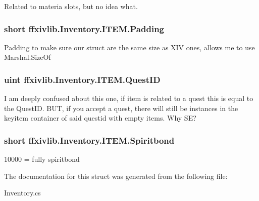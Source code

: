 Related to materia slots, but no idea what. 

\hypertarget{structffxivlib_1_1_inventory_1_1_i_t_e_m_a634f97f3e65815bdbc434e7ab6da0fb5}{
\subsubsection[{Padding}]{\setlength{\rightskip}{0pt plus 5cm}short ffxivlib.\-Inventory.\-I\-T\-E\-M.\-Padding}}\label{structffxivlib_1_1_inventory_1_1_i_t_e_m_a634f97f3e65815bdbc434e7ab6da0fb5}


Padding to make sure our struct are the same size as X\-I\-V ones, allows me to use Marshal.\-Size\-Of 

\hypertarget{structffxivlib_1_1_inventory_1_1_i_t_e_m_ac030523cf6f369af9a9be1987df970ef}{
\subsubsection[{Quest\-I\-D}]{\setlength{\rightskip}{0pt plus 5cm}uint ffxivlib.\-Inventory.\-I\-T\-E\-M.\-Quest\-I\-D}}\label{structffxivlib_1_1_inventory_1_1_i_t_e_m_ac030523cf6f369af9a9be1987df970ef}


I am deeply confused about this one, if item is related to a quest this is equal to the Quest\-I\-D. B\-U\-T, if you accept a quest, there will still be instances in the keyitem container of said questid with empty items. Why S\-E? 

\hypertarget{structffxivlib_1_1_inventory_1_1_i_t_e_m_afd93b5a4c9e11d131b4157666132b233}{
\subsubsection[{Spiritbond}]{\setlength{\rightskip}{0pt plus 5cm}short ffxivlib.\-Inventory.\-I\-T\-E\-M.\-Spiritbond}}\label{structffxivlib_1_1_inventory_1_1_i_t_e_m_afd93b5a4c9e11d131b4157666132b233}


10000 = fully spiritbond 



The documentation for this struct was generated from the following file\-:\begin{DoxyCompactItemize}
\item 
Inventory.\-cs\end{DoxyCompactItemize}
